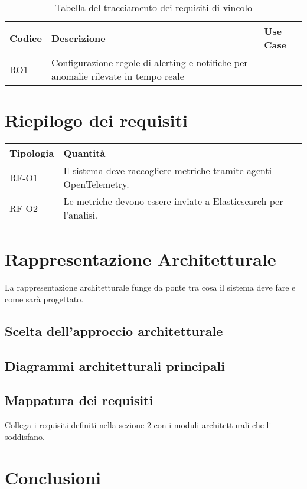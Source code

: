 \begin{table}[h]
\caption{Tabella del tracciamento dei requisiti di vincolo}
\label{tab:requisiti-vincolo}
\begin{tabularx}{\textwidth}{lXl}
\hline\hline
\textbf{Codice} & \textbf{Descrizione} & \textbf{Use Case}\\
\hline
RO1    & Configurazione regole di alerting e notifiche per anomalie rilevate in tempo reale & - \\
\hline
\end{tabularx}
\end{table}

\newpage
\section{Riepilogo dei requisiti}

\begin{center}
\label{tab:requisiti-riepilogo}
\begin{tabular}{|l|p{10cm}|}
\hline
\textbf{Tipologia} & \textbf{Quantità} \\
\hline
RF-O1 & Il sistema deve raccogliere metriche tramite agenti OpenTelemetry. \\
\hline
RF-O2 & Le metriche devono essere inviate a Elasticsearch per l’analisi. \\
\hline
\end{tabular}
\end{center}

\newpage
\section{Rappresentazione Architetturale}
La rappresentazione architetturale funge da ponte tra cosa il sistema deve fare e come sarà progettato.


\subsection{Scelta dell'approccio architetturale}



\subsection{Diagrammi architetturali principali}



\subsection{Mappatura dei requisiti}
Collega i requisiti definiti nella sezione 2 con i moduli architetturali che li soddisfano.



\section{Conclusioni}